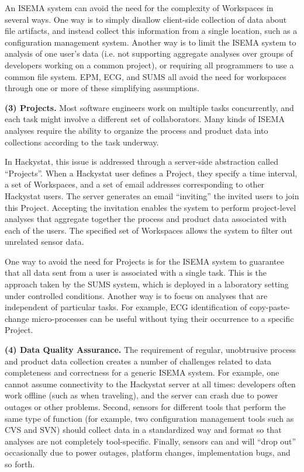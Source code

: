 \documentclass[10pt,twocolumn]{article}
\begin{document}
An ISEMA system can avoid the need for the complexity of Workspaces in
several ways.  One way is to simply disallow client-side collection of data
about file artifacts, and instead collect this information from a single
location, such as a configuration management system.  Another way
is to limit the ISEMA system to analysis of one user's data (i.e. not
supporting aggregate analyses over groups of developers working on a common
project), or requiring all programmers to use a common file system. EPM, 
ECG, and SUMS all avoid the need for workspaces through one or more of these 
simplifying assumptions.

{\bf (3) Projects.} Most software engineers work on multiple tasks
concurrently, and each task might involve a different set of collaborators. 
Many kinds of ISEMA analyses require the ability to organize the process
and product data into collections according to the task underway.  

In Hackystat, this issue is addressed through a server-side abstraction
called ``Projects''.  When a Hackystat user defines a Project, they specify
a time interval, a set of Workspaces, and a set of email addresses
corresponding to other Hackystat users.  The server generates an email
``inviting'' the invited users to join this Project. Accepting
the invitation enables the system to perform project-level analyses that
aggregate together the process and product data associated with each of the
users. The specified set of Workspaces allows the system to filter out 
unrelated sensor data. 

One way to avoid the need for Projects is for the ISEMA system to guarantee
that all data sent from a user is associated with a single task. This is
the approach taken by the SUMS system, which is deployed in a laboratory
setting under controlled conditions. Another way is to focus on analyses
that are independent of particular tasks. For example, ECG identification
of copy-paste-change micro-processes can be useful without tying their
occurrence to a specific Project.

{\bf (4) Data Quality Assurance.} The requirement of regular, unobtrusive
process and product data collection creates a number of challenges related
to data completeness and correctness for a generic ISEMA system.  For
example, one cannot assume connectivity to the Hackystat server at
all times: developers often work offline (such as when traveling), and the
server can crash due to power outages or other problems.  Second, sensors
for different tools that perform the same type of function (for example,
two configuration management tools such as CVS and SVN) should collect data
in a standardized way and format so that analyses are not completely
tool-specific. Finally, sensors can and will ``drop out'' occasionally due
to power outages, platform changes, implementation bugs, and so forth.
\end{document}
